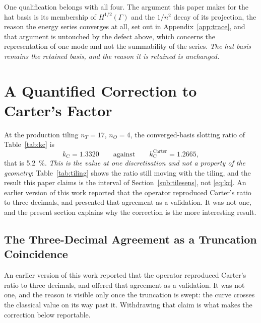 \documentclass[10pt,a4paper,twocolumn]{article}
\theoremstyle{plain}
\theoremstyle{remark}
\begin{document}
One qualification belongs with all four. The argument this paper makes
for the hat basis is its membership of $H^{1/2}(\Gamma)$ and the
$1/n^{2}$ decay of its projection, the reason the energy series
converges at all, set out in Appendix~\ref{app:trace}, and that argument
is untouched by the defect above, which concerns the representation of
one mode and not the summability of the series. \emph{The hat basis
remains the retained basis, and the reason it is retained is unchanged.}

\section{A Quantified Correction to Carter's Factor}
\label{sec:carter}

At the production tiling $n_T=\num{17}$, $n_O=\num{4}$, the
converged-basis slotting ratio of Table~\ref{tab:kc} is
\begin{equation}
k_{\mathrm{C}}=\num{1.3320}
\qquad\text{against}\qquad
k_{\mathrm{C}}^{\text{Carter}}=\num{1.2665},
\label{eq:kc}
\end{equation}
that is \SI{+5.2}{\percent}. \emph{This is the value at one
discretisation and not a property of the geometry}: Table~\ref{tab:tiling}
shows the ratio still moving with the tiling, and the result this paper
claims is the interval of Section~\ref{sub:tilesens}, not \eqref{eq:kc}.
An earlier version of this work reported
that the operator reproduced Carter's ratio to three decimals, and
presented that agreement as a validation. It was not one, and the
present section explains why the correction is the more interesting
result.

\subsection{The Three-Decimal Agreement as a Truncation Coincidence}
\label{sub:kccoincidence}

An earlier version of this work reported that the operator reproduced
Carter's ratio to three decimals, and offered that agreement as a
validation. It was not one, and the reason is visible only once the
truncation is swept: the curve crosses the classical value on its way
past it. Withdrawing that claim is what makes the correction below
reportable.
\end{document}
